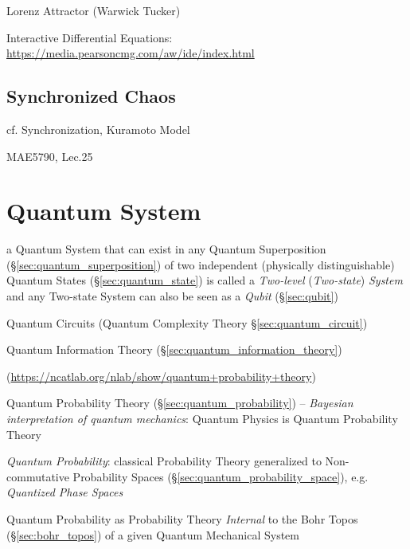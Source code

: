 Lorenz Attractor (Warwick Tucker)

Interactive Differential Equations:
\url{https://media.pearsoncmg.com/aw/ide/index.html}



\subsection{Synchronized Chaos}\label{sec:synchronized_chaos}

cf. Synchronization, Kuramoto Model

MAE5790, Lec.25



\section{Quantum System}\label{sec:quantum_system}


a Quantum System that can exist in any Quantum Superposition
(\S\ref{sec:quantum_superposition}) of two independent (physically
distinguishable) Quantum States (\S\ref{sec:quantum_state}) is called a
\emph{Two-level} (\emph{Two-state}) \emph{System} and any Two-state System can
also be seen as a \emph{Qubit} (\S\ref{sec:qubit})

Quantum Circuits (Quantum Complexity Theory \S\ref{sec:quantum_circuit})

Quantum Information Theory (\S\ref{sec:quantum_information_theory})

(\url{https://ncatlab.org/nlab/show/quantum+probability+theory})

Quantum Probability Theory (\S\ref{sec:quantum_probability}) -- \emph{Bayesian
  interpretation of quantum mechanics}: Quantum Physics is Quantum Probability
Theory

\emph{Quantum Probability}: classical Probability Theory generalized to
Non-commutative Probability Spaces (\S\ref{sec:quantum_probability_space}), e.g.
\emph{Quantized Phase Spaces}

Quantum Probability as Probability Theory \emph{Internal} to the Bohr Topos
(\S\ref{sec:bohr_topos}) of a given Quantum Mechanical System

